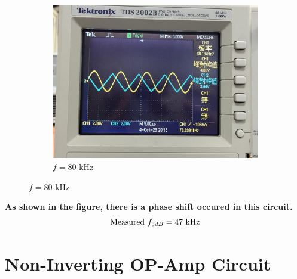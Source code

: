 \documentclass{article}
\begin{document}
\begin{CJK*}{UTF8}{bkai}
\begin{center}
\begin{figure}[h]
\begin{subfigure}[b]{0.3\textwidth}
        \includegraphics[width=\textwidth]{inv_80k.jpg}
        \caption{$f = 80$ \unit{\kilo\hertz}}
    \end{subfigure}
\end{figure}
\end{center}

\textbf{As shown in the figure, there is a phase shift occured in this circuit.}
\begin{equation*}
    \text{Measured } f_{3dB} = 47 \text{ \unit{\kilo\hertz}}
\end{equation*}



\section*{Non-Inverting OP-Amp Circuit}


\end{CJK*}
\end{document}
